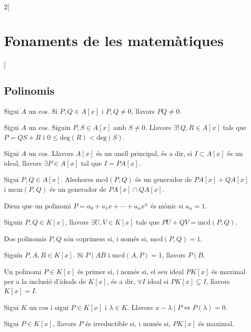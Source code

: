 \documentclass[../../../main.tex]{subfiles}
\begin{document}
\begin{multicols}{2}[\section{Fonaments de les matemàtiques}]
\subsection{Polinomis}
\begin{prop}
Sigui $A$ un cos. Si $P,Q\in A[x]$ i $P,Q\ne0$, llavors $PQ\ne 0$.
\end{prop}
\begin{theorem}
Sigui $A$ un cos. Siguin $P,S\in A[x]$ amb $S\ne 0$. Llavors $\exists!\, Q,R\in A[x]$ tals que $P=QS+R$ i $0\leq\text{deg}(R)<\text{deg}(S)$.
\end{theorem}
\begin{theorem}
Sigui $A$ un cos. Llavors $A[x]$ és un anell principal, és a dir, si $I\subset A[x]$ és un ideal, llavors $\exists P\in A[x]$ tal que $I=PA[x]$.
\end{theorem}
\begin{definition}
Sigui $P,Q\in A[x]$. Aleshores $\text{mcd}(P,Q)$ és un generador de $PA[x]+QA[x]$ i $\text{mcm}(P,Q)$ és un generador de $PA[x]\cap QA[x]$.
\end{definition}
\begin{definition}
Diem que un polinomi $P=a_0+a_1x+\cdots+a_nx^n$ és mònic si $a_n=1$.
\end{definition}
\begin{theorem}
Siguin $P,Q\in K[x]$, llavors $\exists U,V\in K[x]$ tals que $PU+QV=\text{mcd}(P,Q)$.
\end{theorem}
\begin{definition}
Dos polinomis $P,Q$ són coprimers si, i només si, $\text{mcd}(P,Q)=1$.
\end{definition}
\begin{theorem}
Siguin $P,A,B\in K[x]$. Si $P\mid AB$ i $\text{mcd}(A,P)=1$, llavors $P\mid B$.
\end{theorem}
\begin{definition}
Un polinomi $P\in K[x]$ és primer si, i només si, el seu ideal $PK[x]$ és maximal per a la inclusió d'ideals de $K[x]$, és a dir, $\forall I$ ideal si $PK[x] \varsubsetneq I$, llavors $K[x]=I$.
\end{definition}
\begin{theorem}
Sigui $K$ un cos i sigui $P\in K[x]$ i $\lambda\in K$. Llavors $x-\lambda\mid P\iff P(\lambda)=0$.
\end{theorem}
\begin{definition}
Sigui $P\in K[x]$, llavors $P$ és irreductible si, i només si, $PK[x]$ és maximal.

\end{definition}
\end{multicols}
\end{document}
